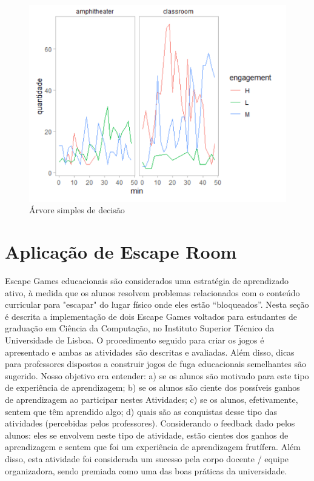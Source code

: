 \begin{figure}
    \centering
    \includegraphics[width=.9\textwidth]{chaps/Images/figura2_copus.png}
    \caption{Árvore simples de decisão}
    \label{fig:arvore_simples_decisao2}
\end{figure}

\section{Aplicação de Escape Room}

Escape Games educacionais são considerados uma estratégia de aprendizado ativo, à medida que os alunos resolvem problemas relacionados com o conteúdo curricular para "escapar" do lugar físico onde eles estão “bloqueados”. Nesta seção é descrita a implementação de dois Escape Games voltados para estudantes de graduação em Ciência da Computação, no Instituto Superior Técnico da Universidade de Lisboa. O procedimento seguido para criar os jogos é apresentado e ambas as atividades são descritas e avaliadas. Além disso, dicas para professores dispostos a construir jogos de fuga educacionais semelhantes são sugerido. Nosso objetivo era entender: a) se os alunos são motivado para este tipo de experiência de aprendizagem; b) se os alunos são ciente dos possíveis ganhos de aprendizagem ao participar nestes Atividades; c) se os alunos, efetivamente, sentem que têm aprendido algo; d) quais são as conquistas desse tipo das atividades (percebidas pelos professores). Considerando o feedback dado pelos alunos: eles se envolvem neste tipo de atividade, estão cientes dos ganhos de aprendizagem e sentem que foi um experiência de aprendizagem frutífera. Além disso, esta atividade foi considerada um sucesso pela corpo docente / equipe organizadora, sendo premiada como uma das boas práticas da universidade.

